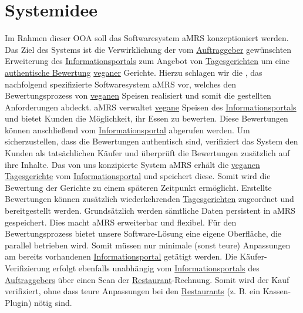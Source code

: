 \section{Systemidee}

Im Rahmen dieser \ac{OOA} soll das Softwaresystem \ac{aMRS} konzeptioniert werden.
\newparagraph
Das Ziel des Systems ist die Verwirklichung der vom \hyperref[gls:auftraggeber]{Auftraggeber} gewünschten Erweiterung des \hyperref[gls:informationsportal]{Informationsportals} zum Angebot von \hyperref[gls:tagesgericht]{Tagesgerichten} um eine \hyperref[gls:authentischeBewertung]{authentische Bewertung} \hyperref[gls:vegan]{veganer} Gerichte.
Hierzu schlagen wir die \vFKW, das nachfolgend spezifizierte Softwaresystem \ac{aMRS} vor, welches den Bewertungsprozess von \hyperref[gls:vegan]{veganen} Speisen realisiert und somit die gestellten Anforderungen abdeckt.
\ac{aMRS} verwaltet \hyperref[gls:vegan]{vegane} Speisen des \hyperref[gls:informationsportal]{Informationsportals} und bietet Kunden die Möglichkeit, ihr Essen zu bewerten.
Diese Bewertungen können anschließend vom \hyperref[gls:informationsportal]{Informationsportal} abgerufen werden.
Um sicherzustellen, dass die Bewertungen authentisch sind, verifiziert das System den Kunden als tatsächlichen Käufer und überprüft die Bewertungen zusätzlich auf ihre Inhalte.
\newparagraph
Das von uns konzipierte System \ac{aMRS} erhält die \hyperref[gls:vegan]{veganen} \hyperref[gls:tagesgericht]{Tagesgerichte} vom \hyperref[gls:informationsportal]{Informationsportal} und speichert diese.
Somit wird die Bewertung der Gerichte zu einem späteren Zeitpunkt ermöglicht.
Erstellte Bewertungen können zusätzlich wiederkehrenden \hyperref[gls:tagesgericht]{Tagesgerichten} zugeordnet und bereitgestellt werden. Grundsätzlich werden sämtliche Daten persistent in \ac{aMRS} gespeichert.
Dies macht \ac{aMRS} erweiterbar und flexibel.
\newparagraph
Für den Bewertungsprozess bietet unsere Software-Lösung eine eigene Oberfläche, die parallel betrieben wird.
Somit müssen nur minimale (sonst teure) Anpassungen am bereits vorhandenen \hyperref[gls:informationsportal]{Informationsportal} getätigt werden.
Die Käufer-Verifizierung erfolgt ebenfalls unabhängig vom \hyperref[gls:informationsportal]{Informationsportals} des \hyperref[gls:auftraggeber]{Auftraggebers} über einen Scan der \hyperref[gls:restaurant]{Restaurant}-Rechnung.
Somit wird der Kauf verifiziert, ohne dass teure Anpassungen bei den \hyperref[gls:restaurant]{Restaurants} (z. B. ein Kassen-Plugin) nötig sind.

